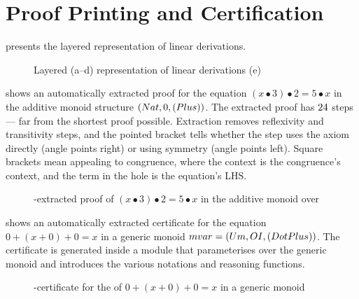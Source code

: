 \section{Proof Printing and Certification}
 presents the layered representation of
linear derivations.
%
\begin{figure}
\caption{Layered (a--d) representation of linear derivations (e)}
\end{figure}

 shows an automatically extracted proof for
the equation $(x•3)•2 = 5•x$ in the additive monoid structure $(\Nat,
0, (\Plus))$. The extracted proof has $24$ steps ---
 far from the shortest proof possible.
Extraction removes reflexivity and transitivity steps, and the pointed
bracket tells whether the step uses the axiom directly (angle points
right) or using symmetry (angle points left). Square brackets mean
appealing to congruence, where the context is the congruence's
context, and the term in the hole is the equation's LHS.
\begin{figure}
  \IntroPrintedListing{}
  \caption{\Frexlib-extracted proof of $(x•3)•2 = 5•x$
    in the additive monoid over \Nat{}}
\end{figure}
 shows an automatically extracted certificate
for the equation $0 + (x + 0) + 0 = x$ in a generic monoid $\mvar{} =
(\Um{}, \OI{}, (\DotPlus))$.  The certificate is generated inside a
module that parameterises over the generic monoid \mvar{} and
introduces the various notations and reasoning functions.

\begin{figure}
  \Certificate{}
  \caption{\Frexlib-certificate for the  of $0 + (x + 0) + 0 = x$ in a generic monoid \mvar{}}
\end{figure}
